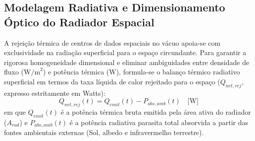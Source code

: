 \subsection{Modelagem Radiativa e Dimensionamento Óptico do Radiador Espacial}
\label{sec:modelagem_radiador_espacial}

A rejeição térmica de centros de dados espaciais no vácuo apoia-se com exclusividade na radiação superficial para o espaço circundante. Para garantir a rigorosa homogeneidade dimensional e eliminar ambiguidades entre densidade de fluxo ($\text{W/m}^2$) e potência térmica ($\text{W}$), formula-se o balanço térmico radiativo superficial em termos da taxa líquida de calor rejeitado para o espaço ($Q_{net,rej}$, expresso estritamente em Watts):
\begin{equation}
    Q_{net,rej}(t) = Q_{emit}(t) - P_{abs,amb}(t) \quad \text{[W]}
    \label{eq:balanco_liquido_radiador_potencia}
\end{equation}
em que $Q_{emit}(t)$ é a potência térmica bruta emitida pela área ativa do radiador ($A_{rad}$) e $P_{abs,amb}(t)$ é a potência radiativa parasita total absorvida a partir das fontes ambientais externas (Sol, albedo e infravermelho terrestre).

